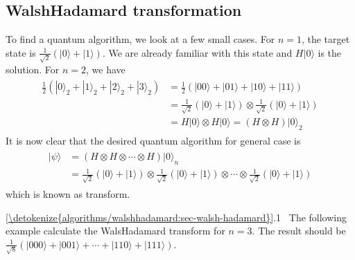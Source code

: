 \documentclass[letterpaper,10pt,english]{jupyterBook}
\begin{document}
\subsection{Walsh\sphinxhyphen{}Hadamard transformation}
\label{\detokenize{algorithms/walshhadamard:id1}}
\sphinxAtStartPar
To find a quantum algorithm, we look at a few small cases. For \(n=1\), the target state is \(\frac{1}{\sqrt{2}}\left(|0\rangle + |1\rangle\right)\).  We are already familiar with this state and \(H|0\rangle\) is the solution.  For \(n=2\), we have
\begin{equation*}
\begin{split}
\begin{align}
\frac{1}{2}\left(|0\rangle_2 + |1\rangle_2 + |2\rangle_2 + |3\rangle_2 \right) &=
\frac{1}{2}\left(|00\rangle + |01\rangle + |10\rangle + |11\rangle\right) \\
& = \frac{1}{\sqrt{2}}\left(|0\rangle + |1\rangle\right) \otimes \frac{1}{\sqrt{2}}\left(|0\rangle + |1\rangle\right) \\
& = H|0\rangle \otimes H|0\rangle = (H\otimes H) |0\rangle_2
\end{align}
\end{split}
\end{equation*}
\sphinxAtStartPar
It is now clear that the desired quantum algorithm for general case is
\begin{equation}\label{equation:algorithms/walshhadamard:walsh-hadamard}
\begin{split}
\begin{align}
|\psi\rangle &= (H \otimes H \otimes \cdots \otimes H) |0\rangle_n \\
& = \frac{1}{\sqrt{2}}\left(|0\rangle + |1\rangle\right) \otimes \frac{1}{\sqrt{2}}\left(|0\rangle + |1\rangle\right) \otimes \cdots \otimes \frac{1}{\sqrt{2}}\left(|0\rangle + |1\rangle\right)
\end{align}
\end{split}
\end{equation}
\sphinxAtStartPar
which is known as  transform.

\sphinxAtStartPar
{} \hyperref[\detokenize{algorithms/walshhadamard:sec-walsh-hadamard}]{\ref{\detokenize{algorithms/walshhadamard:sec-walsh-hadamard}}}.1   The following example calculate the Wals\sphinxhyphen{}Hadamard transform for \(n=3\).  The result should be \(\frac{1}{\sqrt{8}} \left(|000\rangle + |001\rangle + \cdots + |110\rangle + |111\rangle \right)\).
\end{document}
